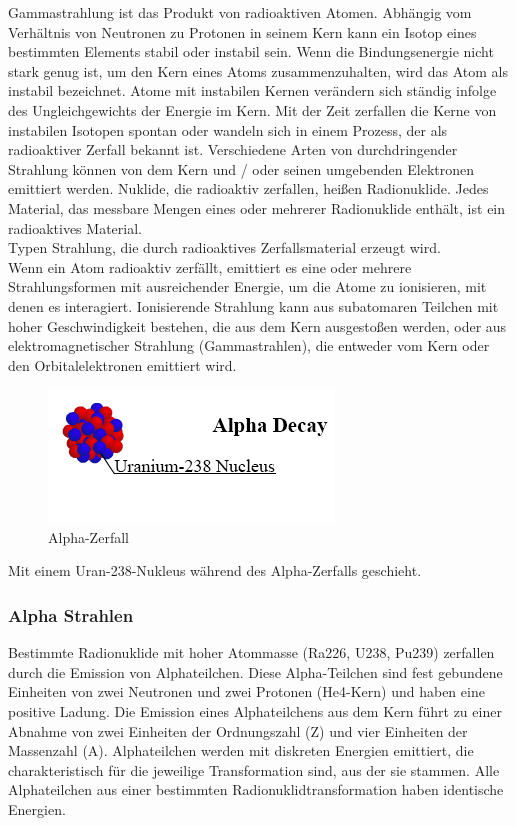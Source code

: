Gammastrahlung ist das Produkt von radioaktiven Atomen. Abhängig vom Verhältnis von Neutronen zu Protonen in seinem Kern kann ein Isotop eines bestimmten Elements stabil oder instabil sein. Wenn die Bindungsenergie nicht stark genug ist, um den Kern eines Atoms zusammenzuhalten, wird das Atom als instabil bezeichnet. Atome mit instabilen Kernen verändern sich ständig infolge des Ungleichgewichts der Energie im Kern. Mit der Zeit zerfallen die Kerne von instabilen Isotopen spontan oder wandeln sich in einem Prozess, der als radioaktiver Zerfall bekannt ist. Verschiedene Arten von durchdringender Strahlung können von dem Kern und / oder seinen umgebenden Elektronen emittiert werden. Nuklide, die radioaktiv zerfallen, heißen Radionuklide. Jedes Material, das messbare Mengen eines oder mehrerer Radionuklide enthält, ist ein radioaktives Material.\\
Typen Strahlung, die durch radioaktives Zerfallsmaterial erzeugt wird.\\
Wenn ein Atom radioaktiv zerfällt, emittiert es eine oder mehrere Strahlungsformen mit ausreichender Energie, um die Atome zu ionisieren, mit denen es interagiert. Ionisierende Strahlung kann aus subatomaren Teilchen mit hoher Geschwindigkeit bestehen, die aus dem Kern ausgestoßen werden, oder aus elektromagnetischer Strahlung (Gammastrahlen), die entweder vom Kern oder den Orbitalelektronen emittiert wird.
\begin{figure}[htb]
  \centering  
  \includegraphics[scale=0.7]{img/uranium.png}
  \caption{Alpha-Zerfall}
  \label{fig:uranium}
\end{figure}

 Mit einem Uran-238-Nukleus während des Alpha-Zerfalls geschieht.
 \subsubsection{Alpha Strahlen}
 Bestimmte Radionuklide mit hoher Atommasse (Ra226, U238, Pu239) zerfallen durch die Emission von Alphateilchen. Diese Alpha-Teilchen sind fest gebundene Einheiten von zwei Neutronen und zwei Protonen (He4-Kern) und haben eine positive Ladung. Die Emission eines Alphateilchens aus dem Kern führt zu einer Abnahme von zwei Einheiten der Ordnungszahl (Z) und vier Einheiten der Massenzahl (A). Alphateilchen werden mit diskreten Energien emittiert, die charakteristisch für die jeweilige Transformation sind, aus der sie stammen. Alle Alphateilchen aus einer bestimmten Radionuklidtransformation haben identische Energien.
